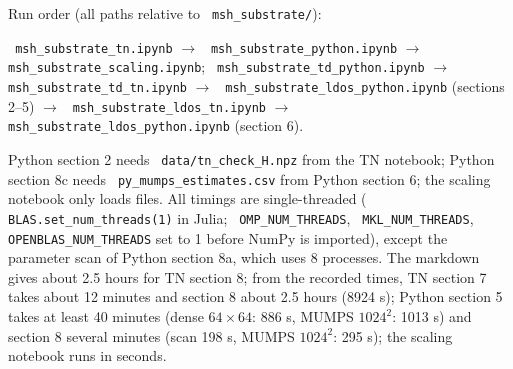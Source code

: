 \documentclass[11pt]{article}
\renewcommand{\code}[1]{\texttt{\hyphenchar\font=-1 #1}}
\begin{document}
Run order (all paths relative to \code{msh\_substrate/}):
\begin{center}\code{msh\_substrate\_tn.ipynb} $\to$ \code{msh\_substrate\_python.ipynb} $\to$ \code{msh\_substrate\_scaling.ipynb};\quad
\code{msh\_substrate\_td\_python.ipynb} $\to$ \code{msh\_substrate\_td\_tn.ipynb} $\to$ \code{msh\_substrate\_ldos\_python.ipynb} (sections 2--5)
$\to$ \code{msh\_substrate\_ldos\_tn.ipynb} $\to$ \code{msh\_substrate\_ldos\_python.ipynb} (section 6).\end{center}
Python section 2 needs \code{data/tn\_check\_H.npz} from the TN notebook; Python section 8c needs \code{py\_mumps\_estimates.csv} from
Python section 6; the scaling notebook only loads files. All timings are single-threaded (\code{BLAS.set\_num\_threads(1)} in Julia;
\code{OMP\_NUM\_THREADS}, \code{MKL\_NUM\_THREADS}, \code{OPENBLAS\_NUM\_THREADS} set to 1 before NumPy is imported), except the parameter scan of
Python section 8a, which uses 8 processes. The markdown gives about 2.5 hours for TN section 8; from the recorded times, TN section 7 takes about 12 minutes and section 8 about 2.5 hours (8924 s); Python section 5 takes at least 40 minutes (dense $64\times64$: 886 s, MUMPS $1024^2$: 1013 s) and section 8 several minutes (scan 198 s, MUMPS $1024^2$: 295 s); the scaling notebook runs in seconds.
\end{document}
